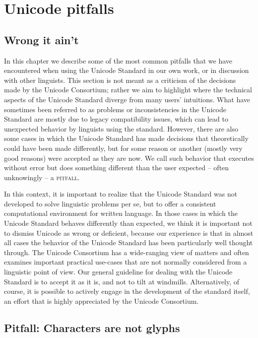 \chapter{Unicode pitfalls}
\label{unicode-pitfalls}

\section{Wrong it ain't}
\label{wrong-it-is-not}

In this chapter we describe some of the most common pitfalls that we have
encountered when using the Unicode Standard in our own work, or in discussion
with other linguists. This section is not meant as a criticism of the decisions
made by the Unicode Consortium; rather we aim to highlight where the
technical aspects of the Unicode Standard diverge from many users'
intuitions. What have sometimes been referred to as problems or inconsistencies
in the Unicode Standard are mostly due to legacy compatibility issues, which can
lead to unexpected behavior by linguists using the standard. However, there are
also some cases in which the Unicode Standard has made decisions that
theoretically could have been made differently, but for some reason or another
(mostly very good reasons) were accepted as they are now. We call such behavior that
executes without error but does something different than the user
expected -- often unknowingly -- a \textsc{pitfall}.

In this context, it is important to realize that the Unicode Standard was not
developed to solve linguistic problems per se, but to offer a consistent
computational environment for written language. In those cases in which the
Unicode Standard behaves differently than expected, we think it is important not
to dismiss Unicode as wrong or deficient, because our
experience is that in almost all cases the behavior of the Unicode Standard has
been particularly well thought through. The Unicode Consortium has a 
wide-ranging view of matters and often examines important practical use-cases
that are not normally considered from a linguistic point of view. Our general
guideline for dealing with the Unicode Standard is to accept it as it is, and
not to tilt at windmills. Alternatively, of course, it is possible to actively
engage in the development of the standard itself, an effort that is highly
appreciated by the Unicode Consortium.

\section{Pitfall: Characters are not glyphs}
\label{pitfall-characters-are-not-glyphs}

